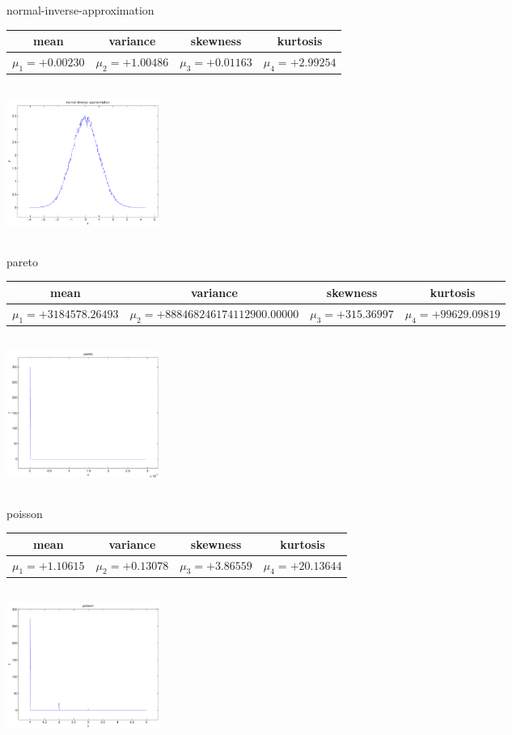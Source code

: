 \documentclass[9pt]{article}
\theoremstyle{plain}
\theoremstyle{definition}
\theoremstyle{remark}
\numberwithin{equation}{section}
\begin{document}
\newpage
normal-inverse-approximation \begin{tabular}{|c|c|c|c|}  mean & variance & skewness & kurtosis \\  \hline
$\mu_1 = +0.00230$ & $\mu_2 = +1.00486$ & $\mu_3 = +0.01163$ & $\mu_4 =+2.99254$ \\
\end{tabular}

\includegraphics[width=5cm,height=5cm]{normal-inverse-approximation.pdf}

pareto \begin{tabular}{|c|c|c|c|}  mean & variance & skewness & kurtosis \\  \hline
$\mu_1 = +3184578.26493$ & $\mu_2 = +888468246174112900.00000$ & $\mu_3 = +315.36997$ & $\mu_4 =+99629.09819$ \\
\end{tabular}

\includegraphics[width=5cm,height=5cm]{pareto.pdf}

poisson \begin{tabular}{|c|c|c|c|}  mean & variance & skewness & kurtosis \\  \hline
$\mu_1 = +1.10615$ & $\mu_2 = +0.13078$ & $\mu_3 = +3.86559$ & $\mu_4 =+20.13644$ \\
\end{tabular}

\includegraphics[width=5cm,height=5cm]{poisson.pdf}
\end{document}

